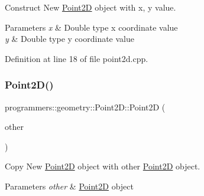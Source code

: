 Construct New \hyperlink{classprogrammers_1_1geometry_1_1Point2D}{Point2D} object with x, y value. 


\begin{DoxyParams}{Parameters}
{\em x} & Double type x coordinate value \\
\hline
{\em y} & Double type y coordinate value \\
\hline
\end{DoxyParams}


Definition at line 18 of file point2d.\+cpp.

\mbox{\label{classprogrammers_1_1geometry_1_1Point2D_af02291ab4688ab64da885fa99615531e}} 
\subsubsection{\texorpdfstring{Point2\+D()}{Point2D()}\hspace{0.1cm}{\footnotesize\ttfamily [3/4]}}
{\footnotesize\ttfamily programmers\+::geometry\+::\+Point2\+D\+::\+Point2D (\begin{DoxyParamCaption}\item[{const \hyperlink{classprogrammers_1_1geometry_1_1Point2D}{Point2D} \&}]{other }\end{DoxyParamCaption})\hspace{0.3cm}{\ttfamily [default]}}



Copy New \hyperlink{classprogrammers_1_1geometry_1_1Point2D}{Point2D} object with other \hyperlink{classprogrammers_1_1geometry_1_1Point2D}{Point2D} object. 


\begin{DoxyParams}{Parameters}
{\em other} & \hyperlink{classprogrammers_1_1geometry_1_1Point2D}{Point2D} object \\
\hline
\end{DoxyParams}
\mbox{\label{classprogrammers_1_1geometry_1_1Point2D_a1ca663bb5fa5f8b18525557dc44162a2}} 
